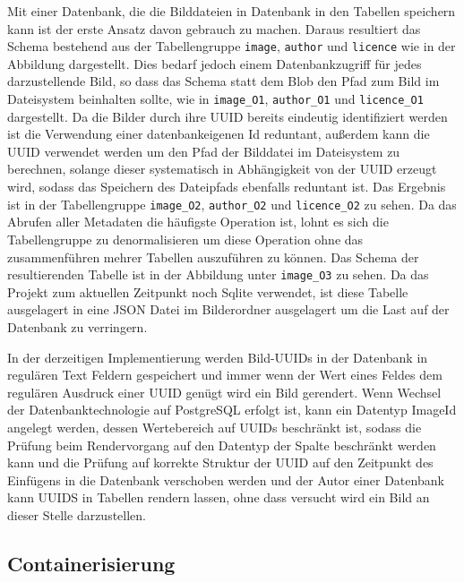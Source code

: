 Mit einer Datenbank, die die Bilddateien in Datenbank in den Tabellen speichern
kann ist der erste Ansatz davon gebrauch zu machen. Daraus resultiert das Schema
bestehend aus der Tabellengruppe \texttt{image}, \texttt{author} und
\texttt{licence} wie in der Abbildung dargestellt. Dies bedarf jedoch einem
Datenbankzugriff für jedes darzustellende Bild, so dass das Schema statt dem
Blob den Pfad zum Bild im Dateisystem beinhalten sollte, wie in
\texttt{image\_O1}, \texttt{author\_O1} und \texttt{licence\_O1} dargestellt. Da
die Bilder durch ihre UUID bereits eindeutig identifiziert werden ist die
Verwendung einer datenbankeigenen Id reduntant, außerdem kann die UUID verwendet
werden um den Pfad der Bilddatei im Dateisystem zu berechnen, solange dieser
systematisch in Abhängigkeit von der UUID erzeugt wird, sodass das Speichern des
Dateipfads ebenfalls reduntant ist. Das Ergebnis ist in der Tabellengruppe
\texttt{image\_O2}, \texttt{author\_O2} und \texttt{licence\_O2} zu sehen. Da
das Abrufen aller Metadaten die häufigste Operation ist, lohnt es sich die
Tabellengruppe zu denormalisieren um diese Operation ohne das zusammenführen
mehrer Tabellen auszuführen zu können. Das Schema der resultierenden Tabelle ist
in der Abbildung unter \texttt{image\_O3} zu sehen. Da das Projekt zum aktuellen
Zeitpunkt noch Sqlite verwendet, ist diese Tabelle ausgelagert in eine JSON
Datei im Bilderordner ausgelagert um die Last auf der Datenbank zu verringern.

In der derzeitigen Implementierung werden Bild-UUIDs in der Datenbank in
regulären Text Feldern gespeichert und immer wenn der Wert eines Feldes dem
regulären Ausdruck einer UUID genügt wird ein Bild gerendert. Wenn Wechsel der
Datenbanktechnologie auf PostgreSQL erfolgt ist, kann ein Datentyp ImageId
angelegt werden, dessen Wertebereich auf UUIDs beschränkt ist, sodass die
Prüfung beim Rendervorgang auf den Datentyp der Spalte beschränkt werden kann
und die Prüfung auf korrekte Struktur der UUID auf den Zeitpunkt des Einfügens
in die Datenbank verschoben werden und der Autor einer Datenbank kann UUIDS in
Tabellen rendern lassen, ohne dass versucht wird ein Bild an dieser Stelle
darzustellen.

\subsection{Containerisierung}
\label{subsec:4-containerization}

